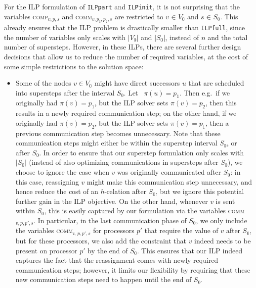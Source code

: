 \documentclass[sigconf,nonacm]{acmart}
\begin{document}
For the ILP formulation of \texttt{ILPpart} and \texttt{ILPinit}, it is not surprising that the variables \textsc{comp}$_{v, p, s}$ and \textsc{comm}$_{v,p_1,p_2,s}$ are restricted to $v _{\!} \in _{\!} V_0$ and $s _{\!} \in _{\!} S_0$. This already ensures that the ILP problem is drastically smaller than \texttt{ILPfull}, since the number of variables only scales with $|V_0|$ and $|S_0|$, instead of $n$ and the total number of supersteps. However, in these ILPs, there are several further design decisions that allow us to reduce the number of required variables, at the cost of some simple restrictions to the solution space:
\begin{itemize}[topsep=4pt,itemsep=0pt,partopsep=2pt,parsep=7pt]
    \item Some of the nodes $v \in V_0$ might have direct successors $u$ that are scheduled into supersteps after the interval $S_0$. Let \ $\pi(u)=p_1$. Then e.g.\ if we originally had $\pi(v)=p_1$, but the ILP solver sets $\pi(v)=p_2$, then this results in a newly required communication step; on the other hand, if we originally had $\pi(v)=p_2$, but the ILP solver sets $\pi(v)=p_1$, then a previous communication step becomes unnecessary. Note that these communication steps might either be within the superstep interval $S_0$, or after $S_0$. In order to ensure that our superstep formulation only scales with $|S_0|$ (instead of also optimizing communications in supersteps after $S_0$), we choose to ignore the case when $v$ was originally communicated after $S_0$: in this case, reassigning $v$ might make this communication step unnecessary, and hence reduce the cost of an $h$-relation after $S_0$, but we ignore this potential further gain in the ILP objective. On the other hand, whenever $v$ is sent within $S_0$, this is easily captured by our formulation via the variables \textsc{comm}$_{v,p,p',s}$. In particular, in the last communication phase of $S_0$, we only include the variables \textsc{comm}$_{v,p,p',s}$ for processors $p'$ that require the value of $v$ after $S_0$, but for these processors, we also add the constraint that $v$ indeed needs to be present on processor $p'$ by the end of $S_0$. This ensures that our ILP indeed captures the fact that the reassignment comes with newly required communication steps; however, it limits our flexibility by requiring that these new communication steps need to happen until the end of $S_0$.

\end{itemize}
\end{document}
